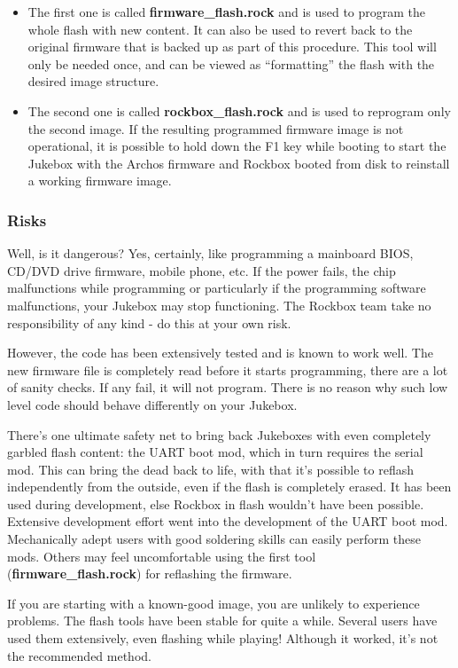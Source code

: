 \begin{itemize}
\item The first one is called \textbf{firmware\_flash.rock} and is used
to program the whole flash with new content.  It can also be used to
revert back to the original firmware that is backed up as part of this
procedure.  This tool will only be needed once, and can be viewed as
``formatting'' the flash with the desired image structure. 
\item The second one is called \textbf{rockbox\_flash.rock }and is used
to reprogram only the second image. If the resulting programmed
firmware image is not operational, it is
possible to hold down the F1 key while booting to start the Jukebox
with the Archos firmware and Rockbox booted from disk to reinstall a
working firmware image. 
\end{itemize}

\subsubsection{\label{ref:PartISection63}Risks}
Well, is it dangerous? Yes, certainly, like programming a
mainboard BIOS, CD/DVD drive firmware,
mobile phone, etc. If the power fails, the chip malfunctions while
programming or particularly if the programming software malfunctions,
your Jukebox may stop functioning. The Rockbox team take no
responsibility of any kind {}- do this at your own risk. 

However, the code has been extensively tested and is known to work well.
 The new firmware file is completely read before it starts programming,
there are a lot of sanity checks. If any fail, it will not program.
There is no reason why such low level code should behave differently on
your Jukebox. 

There's one ultimate safety net to bring back Jukeboxes
with even completely garbled flash content: the UART boot mod, which in
turn requires the serial mod. This can bring the dead back to life,
with that it's possible to reflash independently from the outside, even
if the flash is completely erased. It has been used during development,
else Rockbox in flash wouldn't have been possible.
Extensive development effort went into the development of the UART boot
mod.  Mechanically adept users with good soldering skills can easily
perform these mods. Others may feel uncomfortable using the first tool
(\textbf{firmware\_flash.rock}) for reflashing the firmware.

If you are starting with a known{}-good image, you are unlikely to
experience problems.  The flash tools have been stable for quite a
while. Several users have used them extensively, even flashing while
playing! Although it worked, it's not the recommended
method.  

